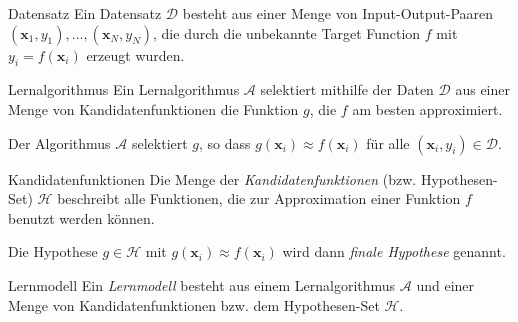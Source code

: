 \begin{defi}{Datensatz}
    Ein Datensatz $\mathcal{D}$ besteht aus einer Menge von Input-Output-Paaren $(\mathbf{x}_1, y_1), \ldots, (\mathbf{x}_N, y_N)$, die durch die unbekannte Target Function $f$ mit $y_i = f(\mathbf{x}_i)$ erzeugt wurden.
\end{defi}

\begin{defi}{Lernalgorithmus}
    Ein Lernalgorithmus $\mathcal{A}$ selektiert mithilfe der Daten $\mathcal{D}$ aus einer Menge von Kandidatenfunktionen die Funktion $g$, die $f$ am besten approximiert.

    Der Algorithmus $\mathcal{A}$ selektiert $g$, so dass $g(\mathbf{x}_i) \approx f(\mathbf{x}_i)$ für alle $(\mathbf{x}_i, y_i) \in \mathcal{D}$.
\end{defi}

\begin{defi}{Kandidatenfunktionen}
    Die Menge der \emph{Kandidatenfunktionen} (bzw. Hypothesen-Set) $\mathcal{H}$ beschreibt alle Funktionen, die zur Approximation einer Funktion $f$ benutzt werden können.

    Die Hypothese $g \in \mathcal{H}$ mit $g(\mathbf{x}_i) \approx f(\mathbf{x}_i)$ wird dann \emph{finale Hypothese} genannt.
\end{defi}

\begin{defi}{Lernmodell}
    Ein \emph{Lernmodell} besteht aus einem Lernalgorithmus $\mathcal{A}$ und einer Menge von Kandidatenfunktionen bzw. dem Hypothesen-Set $\mathcal{H}$.
\end{defi}

